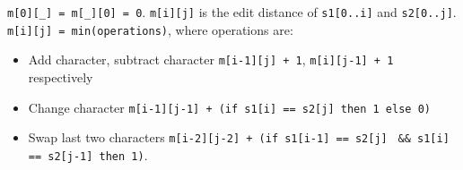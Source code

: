 \verb-m[0][_] = m[_][0] = 0-. \verb-m[i][j]- is the edit distance of \verb-s1[0..i]- and
\verb-s2[0..j]-. \verb-m[i][j] = min(operations)-, where operations are:
\begin{itemize}
\item Add character, subtract character \verb|m[i-1][j] + 1|, \verb|m[i][j-1] + 1| respectively
\item Change character \verb|m[i-1][j-1] + (if s1[i] == s2[j] then 1 else 0)|
\item Swap last two characters \verb|m[i-2][j-2] + (if s1[i-1] == s2[j]|
\verb| && s1[i] == s2[j-1] then 1)|.
\end{itemize}